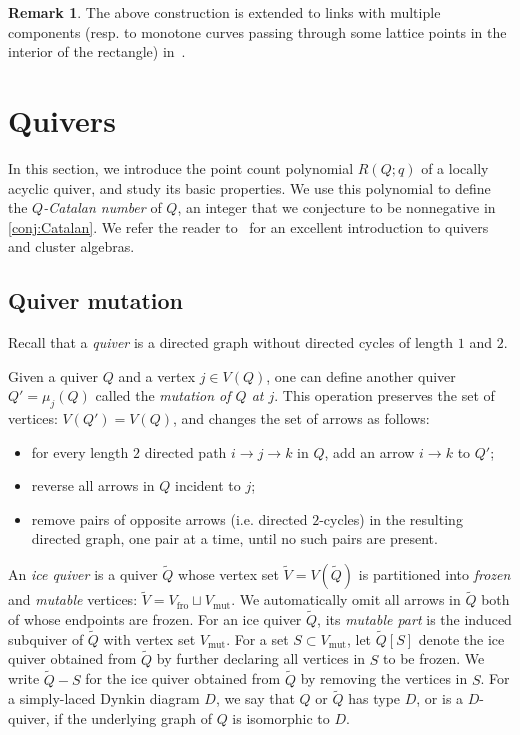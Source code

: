 \documentclass[11pt]{article}
\theoremstyle{definition}
\newtheorem{remark}[theo]{Remark}
\numberwithin{equation}{section}
\newcommand\Qice{\widetilde{Q}}
\newcommand\Vice{\widetilde{V}}
\newcommand\fro{\operatorname{fro}}
\newcommand\mut{\operatorname{mut}}
\newcommand\Vfro{V_{\fro}}
\newcommand\Vmut{V_{\mut}}
\def\Qicefr[#1]{\Qice[#1]}
\newcommand\Louise{locally acyclic\xspace}
\begin{document}
\begin{remark}
The above construction is extended to links with multiple components (resp. to monotone curves passing through some lattice points in the interior of the rectangle) in~\cite[Section~7.3]{GL_EHA}.
\end{remark} 


\section{Quivers}
In this section, we introduce the point count polynomial $R(Q;q)$ of a \Louise %
 quiver, and study its basic properties.  We use this polynomial to define the \emph{$Q$-Catalan number} of $Q$, an integer that we conjecture to be nonnegative in \cref{conj:Catalan}. We refer the reader to~\cite{FWZ_book} for an excellent introduction to quivers and cluster algebras.

\subsection{Quiver mutation}\label{sec:quiver}
Recall that a \emph{quiver} is a directed graph without directed cycles of length $1$ and $2$.

Given a quiver $Q$ and a vertex $j\in V(Q)$, one can define another quiver $Q'=\mu_j(Q)$ called the \emph{mutation of $Q$ at $j$}. This operation preserves the set of vertices:  $V(Q')=V(Q)$, and changes the set of arrows as follows:
\begin{itemize}
\item for every length $2$ directed path $i\to j\to k$ in $Q$, add an arrow $i\to k$ to $Q'$;
\item reverse all arrows in $Q$ incident to $j$;
\item remove pairs of opposite arrows (i.e.  directed $2$-cycles) in the resulting directed graph, one pair at a time, until no such pairs are present.
\end{itemize}

An \emph{ice quiver} is a quiver $\Qice$ whose vertex set $\Vice=V(\Qice)$ is partitioned into \emph{frozen} and \emph{mutable} vertices: $\Vice=\Vfro\sqcup \Vmut$. We automatically omit all arrows in $\Qice$ both of whose endpoints are frozen. For an ice quiver $\Qice$, its \emph{mutable part} is the induced subquiver of $\Qice$ with vertex set $\Vmut$.  %
 For a set $S\subset \Vmut$, let $\Qicefr[S]$ denote the ice quiver obtained from $\Qice$ by further declaring all vertices in $S$ to be frozen. We write $\Qice-S$ for the ice quiver obtained from $\Qice$ by removing the vertices in $S$.  For a simply-laced Dynkin diagram $D$, we say that $Q$ or $\Qice$ has type $D$, or is a $D$-quiver, if the underlying graph of $Q$ is isomorphic to $D$.
\end{document}
